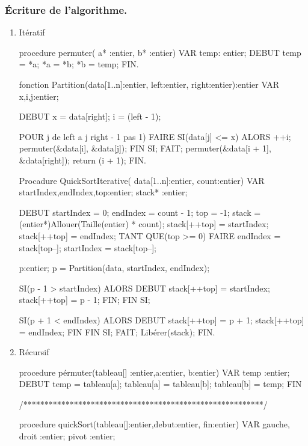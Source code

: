\documentclass[12pt]{article}
\begin{document}
\subsubsection{Écriture de l'algorithme.}
\begin{enumerate}
	\item Itératif
	\begin{sql}
procedure permuter( a* :entier, b* :entier)
	VAR
		temp: entier;
	DEBUT
		temp = *a;
		*a = *b;
		*b = temp;
	FIN.

	fonction Partition(data[1..n]:entier, left:entier, right:entier):entier
	VAR
		x,i,j:entier;
	
	DEBUT
		x = data[right];
		i = (left - 1);
		
		POUR j de left a j right - 1 pas 1)
		FAIRE
			SI(data[j] <= x)
				ALORS
					++i;
					permuter(&data[i], &data[j]);
			FIN SI;
		FAIT;
			permuter(&data[i + 1], &data[right]);
			return (i + 1);
	FIN.

	Procadure QuickSortIterative( data[1..n]:entier, count:entier) 
	VAR
		startIndex,endIndex,top:entier;
		stack* :entier;
	
	DEBUT
		startIndex = 0;
		endIndex = count - 1;
		top = -1;
		stack = (entier*)Allouer(Taille(entier) * count);
		stack[++top] = startIndex;
		stack[++top] = endIndex;
		TANT QUE(top >= 0)
			FAIRE
				endIndex = stack[top--];
				startIndex = stack[top--];

				p:entier;
				p = Partition(data, startIndex, endIndex);

				SI(p - 1 > startIndex)
				ALORS
					DEBUT
						stack[++top] = startIndex;
						stack[++top] = p - 1;
					FIN;
				FIN SI;

				SI(p + 1 < endIndex)
				ALORS
					DEBUT
						stack[++top] = p + 1;
						stack[++top] = endIndex;
					FIN
				FIN SI;			
			FAIT;
			Libérer(stack);
		FIN.
	\end{sql}
	
\newpage	
	
	\item Récursif
	\begin{sql}			
	procedure pérmuter(tableau[] :entier,a:entier, b:entier)
		VAR
			temp :entier;	
		DEBUT
			temp = tableau[a];
			tableau[a] = tableau[b];
			tableau[b] = temp;
		FIN
				
	/*********************************************************/

	procedure quickSort(tableau[]:entier,debut:entier, fin:entier)
	VAR
		gauche, droit :entier;
		pivot :entier;
					

\end{sql}
\end{enumerate}
\end{document}
